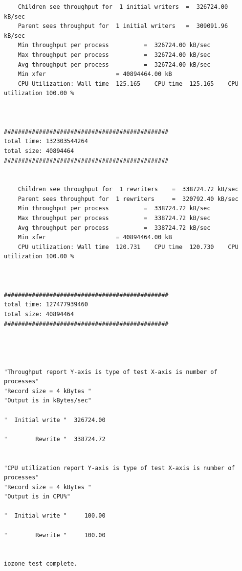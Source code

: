 \documentclass[a4paper]{article}
\begin{document}
{\begin{lstlisting}
	Children see throughput for  1 initial writers 	=  326724.00 kB/sec
	Parent sees throughput for  1 initial writers 	=  309091.96 kB/sec
	Min throughput per process 			=  326724.00 kB/sec 
	Max throughput per process 			=  326724.00 kB/sec
	Avg throughput per process 			=  326724.00 kB/sec
	Min xfer 					= 40894464.00 kB
	CPU Utilization: Wall time  125.165    CPU time  125.165    CPU utilization 100.00 %



###############################################
total time: 132303544264
total size: 40894464
###############################################


	Children see throughput for  1 rewriters 	=  338724.72 kB/sec
	Parent sees throughput for  1 rewriters 	=  320792.40 kB/sec
	Min throughput per process 			=  338724.72 kB/sec 
	Max throughput per process 			=  338724.72 kB/sec
	Avg throughput per process 			=  338724.72 kB/sec
	Min xfer 					= 40894464.00 kB
	CPU utilization: Wall time  120.731    CPU time  120.730    CPU utilization 100.00 %



###############################################
total time: 127477939460
total size: 40894464
###############################################




"Throughput report Y-axis is type of test X-axis is number of processes"
"Record size = 4 kBytes "
"Output is in kBytes/sec"

"  Initial write "  326724.00 

"        Rewrite "  338724.72 


"CPU utilization report Y-axis is type of test X-axis is number of processes"
"Record size = 4 kBytes "
"Output is in CPU%"

"  Initial write "     100.00 

"        Rewrite "     100.00 


iozone test complete.
\end{lstlisting}

}
\end{document}
